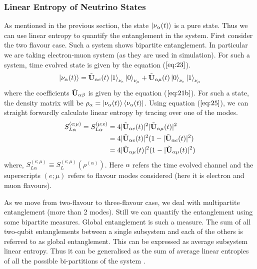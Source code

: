 \documentclass[12pt,a4paper]{report}
\begin{document}
\subsubsection{Linear Entropy of Neutrino States}\label{len}
As mentioned in the previous section, the state $\ket{\nu_{\alpha}(t)}$ is a pure state. Thus we can use linear entropy to quantify the entanglement in the system. First consider the two flavour case. Such a system shows bipartite entanglement. In particular we are taking electron-muon system (as they are used in simulation). For such a system, time evolved state is given by the equation ($\ref{eq:23}$).
\begin{gather}
\ket{\nu_{\alpha}(t)}=\Tilde{\textbf{U}}_{\alpha e}(t) \ket{1}_{\nu_{e}}\ket{0}_{\nu_{\mu}}+\Tilde{\textbf{U}}_{\alpha \mu}(t) \ket{0}_{\nu_{e}}\ket{1}_{\nu_{\mu}}    
\end{gather}
where the coefficients $\Tilde{\textbf{U}}_{\alpha \beta}$ is given by the equation ($\ref{eq:21b}$). 
For such a state, the density matrix will be $\rho_{\alpha}=\ket{\nu_{\alpha} (t)}\bra{\nu_{\alpha} (t)}$. Using equation ($\ref{eq:25}$), we can straight forwardly calculate linear entropy by tracing over one of the modes.
\begin{equation}
  \begin{split}
S_{L\alpha}^{(e;\mu)} = S_{L\alpha}^{(\mu;e)}&=4|\Tilde{\textbf{U}}_{\alpha e}(t)|^{2}|\Tilde{\textbf{U}}_{\alpha \mu}(t)|^{2} \\
&=4|\Tilde{\textbf{U}}_{\alpha e}(t)|^{2}(1-|\Tilde{\textbf{U}}_{\alpha e}(t)|^{2})\\
&=4|\Tilde{\textbf{U}}_{\alpha \mu}(t)|^{2}(1-|\Tilde{\textbf{U}}_{\alpha \mu}(t)|^{2})\\
  \end{split}  
\end{equation}
where, $S_{L\alpha}^{(e;\mu)} \equiv S_{L}^{(e;\mu)}(\rho^{(\alpha)})$. Here $\alpha$ refers the time evolved channel and the superscripts $(e;\mu)$ refers to flavour modes considered (here it is electron and muon flavours).\par
As we move from two-flavour to three-flavour case, we deal with multipartite entanglement (more than 2 modes). Still we can quantify the entanglement using some bipartite measures. Global entanglement is such a measure. The sum of all two-qubit entanglements between a single subsystem and each of the others is referred to as global entanglement. This can be expressed as average subsystem linear entropy. Thus it can be generalised as the sum of average linear entropies of all the possible bi-partitions of the system \cite{amico}\cite{brennen}.\par
\end{document}
